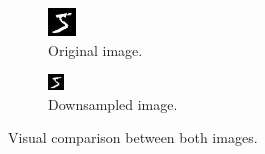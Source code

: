 \begin{figure}
  \centering
  \begin{subfigure}{0.35\textwidth}
    \centering
    \includegraphics[width = \textwidth]{figures/reshaped.jpg}
    \caption{Original image.}
  \end{subfigure} \qquad \qquad
  \begin{subfigure}{0.35\textwidth}
    \centering
    \includegraphics[width = \textwidth]{figures/resized.jpg}
    \caption{Downsampled image.}
  \end{subfigure}
  \caption{Visual comparison between both images.}\label{fig:mnist_resized}
\end{figure} \

